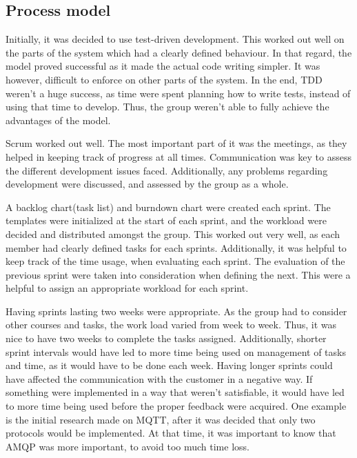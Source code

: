 \subsection{Process model}
\label{subsec:project_evaluation-development-process_model}

Initially, it was decided to use test-driven development. This worked out well on the parts of the system which had a clearly defined behaviour. In that regard, the model proved successful as it made the actual code writing simpler. It was however, difficult to enforce on other parts of the system. In the end, TDD weren't a huge success, as time were spent planning how to write tests, instead of using that time to develop. Thus, the group weren't able to fully achieve the advantages of the model. 

Scrum worked out well. The most important part of it was the meetings, as they helped in keeping track of progress at all times. Communication was key to assess the different development issues faced. Additionally, any problems regarding development were discussed, and assessed by the group as a whole. 

A backlog chart(task list) and burndown chart were created each sprint. The templates were initialized at the start of each sprint, and the workload were decided and distributed amongst the group. This worked out very well, as each member had clearly defined tasks for each sprints. Additionally, it was helpful to keep track of the time usage, when evaluating each sprint. The evaluation of the previous sprint were taken into consideration when defining the next. This were a helpful to assign an appropriate workload for each sprint.

Having sprints lasting two weeks were appropriate. As the group had to consider other courses and tasks, the work load varied from week to week. Thus, it was nice to have two weeks to complete the tasks assigned. Additionally, shorter sprint intervals would have led to more time being used on management of tasks and time, as it would have to be done each week. Having longer sprints could have affected the communication with the customer in a negative way. If something were implemented in a way that weren't satisfiable, it would have led to more time being used before the proper feedback were acquired. One example is the initial research made on MQTT, after it was decided that only two protocols would be implemented. At that time, it was important to know that AMQP was more important, to avoid too much time loss.

